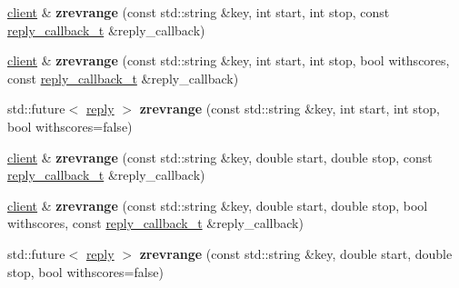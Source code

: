 \begin{DoxyCompactItemize}
\mbox{\hyperlink{classcpp__redis_1_1client}{client}} \& {\bfseries zrevrange} (const std\+::string \&key, int start, int stop, const \mbox{\hyperlink{classcpp__redis_1_1client_af7a65eb21aa25230bfbb0b0203c4fc04}{reply\+\_\+callback\+\_\+t}} \&reply\+\_\+callback)
\item 
\mbox{\label{classcpp__redis_1_1client_a37bfbe4848350144e7899c6d1e63653b}} 
\mbox{\hyperlink{classcpp__redis_1_1client}{client}} \& {\bfseries zrevrange} (const std\+::string \&key, int start, int stop, bool withscores, const \mbox{\hyperlink{classcpp__redis_1_1client_af7a65eb21aa25230bfbb0b0203c4fc04}{reply\+\_\+callback\+\_\+t}} \&reply\+\_\+callback)
\item 
\mbox{\label{classcpp__redis_1_1client_a001bdf0f597d386202b0aab116657055}} 
std\+::future$<$ \mbox{\hyperlink{classcpp__redis_1_1reply}{reply}} $>$ {\bfseries zrevrange} (const std\+::string \&key, int start, int stop, bool withscores=false)
\item 
\mbox{\label{classcpp__redis_1_1client_a7b20d0dc47cf4fb40220e51408876d6d}} 
\mbox{\hyperlink{classcpp__redis_1_1client}{client}} \& {\bfseries zrevrange} (const std\+::string \&key, double start, double stop, const \mbox{\hyperlink{classcpp__redis_1_1client_af7a65eb21aa25230bfbb0b0203c4fc04}{reply\+\_\+callback\+\_\+t}} \&reply\+\_\+callback)
\item 
\mbox{\label{classcpp__redis_1_1client_ac03871ced545f10c9f277fd5fc20f0a0}} 
\mbox{\hyperlink{classcpp__redis_1_1client}{client}} \& {\bfseries zrevrange} (const std\+::string \&key, double start, double stop, bool withscores, const \mbox{\hyperlink{classcpp__redis_1_1client_af7a65eb21aa25230bfbb0b0203c4fc04}{reply\+\_\+callback\+\_\+t}} \&reply\+\_\+callback)
\item 
\mbox{\label{classcpp__redis_1_1client_a85aa18b29763edd1d93c4b463b6b3a51}} 
std\+::future$<$ \mbox{\hyperlink{classcpp__redis_1_1reply}{reply}} $>$ {\bfseries zrevrange} (const std\+::string \&key, double start, double stop, bool withscores=false)
\item 
\mbox{\label{classcpp__redis_1_1client_ab72a94b6f16cb23cf39275bfc9e35385}} 

\end{DoxyCompactItemize}
